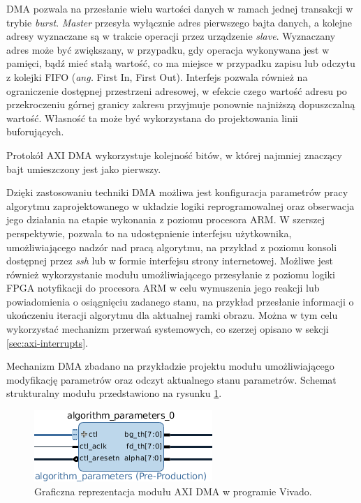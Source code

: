 DMA pozwala na przesłanie wielu wartości danych w ramach jednej transakcji w trybie \emph{burst}. \emph{Master} przesyła wyłącznie adres pierwszego bajta danych, a kolejne adresy wyznaczane są w trakcie operacji przez urządzenie \emph{slave}. Wyznaczany adres może być zwiększany, w przypadku, gdy operacja wykonywana jest w pamięci, bądź mieć stałą wartość, co ma miejsce w przypadku zapisu lub odczytu z kolejki FIFO (\emph{ang.} First In, First Out). Interfejs pozwala również na ograniczenie dostępnej przestrzeni adresowej, w efekcie czego wartość adresu po przekroczeniu górnej granicy zakresu przyjmuje ponownie najniższą dopuszczalną wartość. Własność ta może być wykorzystana do projektowania linii buforujących.

Protokół AXI DMA wykorzystuje kolejność bitów, w której najmniej znaczący bajt umieszczony jest jako pierwszy.

Dzięki zastosowaniu techniki DMA możliwa jest konfiguracja parametrów pracy algorytmu zaprojektowanego w układzie logiki reprogramowalnej oraz obserwacja jego działania na etapie wykonania z poziomu procesora ARM. W szerszej perspektywie, pozwala to na udostępnienie interfejsu użytkownika, umożliwiającego nadzór nad pracą algorytmu, na przykład z poziomu konsoli dostępnej przez \emph{ssh} lub w formie interfejsu strony internetowej. Możliwe jest również wykorzystanie modułu umożliwiającego przesyłanie z poziomu logiki FPGA notyfikacji do procesora ARM w celu wymuszenia jego reakcji lub powiadomienia o osiągnięciu zadanego stanu, na przykład przesłanie informacji o ukończeniu iteracji algorytmu dla aktualnej ramki obrazu. Można w tym celu wykorzystać mechanizm przerwań systemowych, co szerzej opisano w sekcji \ref{sec:axi-interrupts}.

Mechanizm DMA zbadano na przykładzie projektu modułu umożliwiającego modyfikację parametrów oraz odczyt aktualnego stanu parametrów. Schemat strukturalny modułu przedstawiono na rysunku \ref{fig:axi-dma-diagram}.

\begin{figure}[h]
	\centering
	\includegraphics[]{img/algorithm-parameters.png}
	\caption{Graficzna reprezentacja modułu AXI DMA w programie Vivado.}
	\label{fig:axi-dma-diagram}
\end{figure}

